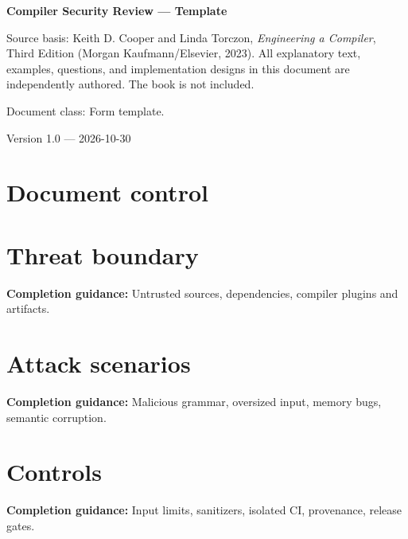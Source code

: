 \documentclass[10pt,letterpaper]{article}
\begin{document}
\hypersetup{pageanchor=false}%
\begin{titlepage}
\centering\vspace*{1.0in}
{\Huge\bfseries\textcolor{CompilerBlue}{Compiler Security Review --- Template}\par}
\vspace{.22in}{\Large Authoring form and printable record\par}
\vspace{.4in}{\large Compiler Engineering Documentation Suite\par}
\vfill
\begin{minipage}{.86\linewidth}\small
Source basis: Keith D. Cooper and Linda Torczon, \emph{Engineering a Compiler}, Third Edition (Morgan Kaufmann/Elsevier, 2023). All explanatory text, examples, questions, and implementation designs in this document are independently authored. The book is not included.\par\medskip
Document class: Form template.
\end{minipage}
\vfill\textcolor{CompilerGray}{Version 1.0 --- 2026-10-30}\par
\end{titlepage}\hypersetup{pageanchor=true}
\tableofcontents\clearpage
\section{Document control}
\section{Threat boundary}
\textbf{Completion guidance:} Untrusted sources, dependencies, compiler plugins and artifacts.\par\medskip{}
\section{Attack scenarios}
\textbf{Completion guidance:} Malicious grammar, oversized input, memory bugs, semantic corruption.\par\medskip{}
\section{Controls}
\textbf{Completion guidance:} Input limits, sanitizers, isolated CI, provenance, release gates.\par\medskip{}
\end{document}
